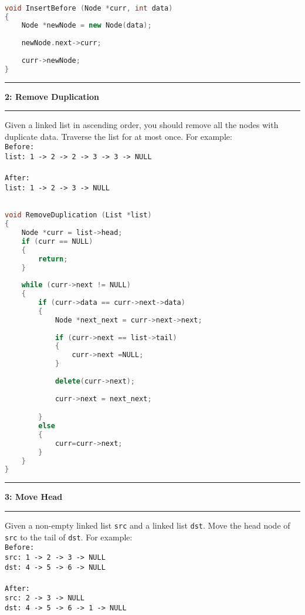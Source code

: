 \documentclass[10.5pt]{article}
\newcommand\question[2]{\vspace{.25in}\hrule\textbf{#1: #2}\vspace{.5em}\hrule\vspace{.10in}}
\begin{document}
\hrulefill
\begin{lstlisting}[language=C++]

void InsertBefore (Node *curr, int data)
{
    Node *newNode = new Node(data);
    
    newNode.next->curr;
    
    curr->newNode;
}

\end{lstlisting}

\pagebreak

\question{2}{Remove Duplication}
Given a linked list in ascending order, you should remove all the nodes with duplicate data. Traverse the list for at most once. For example: \\

\texttt{Before:}\\
\texttt{list: 1 -> 2 -> 2 -> 3 -> 3 -> NULL}\\
\\
\texttt{After:}\\
\texttt{list: 1 -> 2 -> 3 -> NULL}\\


\hrulefill
\begin{lstlisting}[language=C++]

void RemoveDuplication (List *list)
{
    Node *curr = list->head;
    if (curr == NULL) 
    {
        return;
    }
	
    while (curr->next != NULL)
    {
        if (curr->data == curr->next->data)
        {
            Node *next_next = curr->next->next;
                        
            if (curr->next == list->tail)
            {
                curr->next =NULL;
            }
            
            delete(curr->next);
            
            curr->next = next_next;

        }
        else
        {
            curr=curr->next;
        }
    }
}
\end{lstlisting}
\pagebreak


\question{3}{Move Head}
Given a non-empty linked list \texttt{src} and a linked list \texttt{dst}. Move the head node of \texttt{src} to the tail of \texttt{dst}. For example: \\

\texttt{Before:}\\
\texttt{src: 1 -> 2 -> 3 -> NULL}\\
\texttt{dst: 4 -> 5 -> 6 -> NULL}\\
\\
\texttt{After:}\\
\texttt{src: 2 -> 3 -> NULL}\\
\texttt{dst: 4 -> 5 -> 6 -> 1 -> NULL}\\
\end{document}
